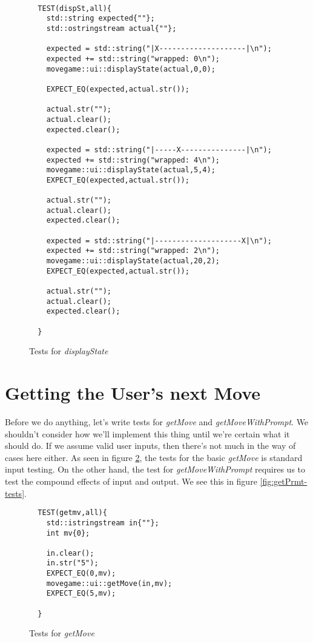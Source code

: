 \documentclass[nobib]{tufte-handout}
\begin{document}
\begin{figure}[!htbp]
\begin{lstlisting}

  TEST(dispSt,all){
    std::string expected{""};
    std::ostringstream actual{""};

    expected = std::string("|X--------------------|\n");
    expected += std::string("wrapped: 0\n");
    movegame::ui::displayState(actual,0,0);

    EXPECT_EQ(expected,actual.str());

    actual.str("");
    actual.clear();
    expected.clear();

    expected = std::string("|-----X---------------|\n");
    expected += std::string("wrapped: 4\n");
    movegame::ui::displayState(actual,5,4);
    EXPECT_EQ(expected,actual.str());

    actual.str("");
    actual.clear();
    expected.clear();   

    expected = std::string("|--------------------X|\n");
    expected += std::string("wrapped: 2\n");
    movegame::ui::displayState(actual,20,2);
    EXPECT_EQ(expected,actual.str());

    actual.str("");
    actual.clear();
    expected.clear();   

  }

\end{lstlisting}
\caption{Tests for \textit{displayState}}
\label{fig:display-tests}
\end{figure}


\section{Getting the User's next Move}

Before we do anything, let's write tests for \textit{getMove} and \textit{getMoveWithPrompt}. We shouldn't consider how we'll implement this thing until we're certain what it should do. If we assume valid user inputs, then there's not much in the way of cases here either. As seen in figure \ref{fig:get-tests}, the tests for the basic \textit{getMove} is standard input testing.  On the other hand, the test for \textit{getMoveWithPrompt} requires us to test the compound effects of input and output. We see this in figure \ref{fig:getPrmt-tests}.

\begin{figure}[!htbp]
\begin{lstlisting}
  TEST(getmv,all){
    std::istringstream in{""};
    int mv{0};

    in.clear();
    in.str("5");
    EXPECT_EQ(0,mv);    
    movegame::ui::getMove(in,mv);
    EXPECT_EQ(5,mv);

  }
\end{lstlisting}
\caption{Tests for \textit{getMove}}
\label{fig:get-tests}
\end{figure}
\end{document}
